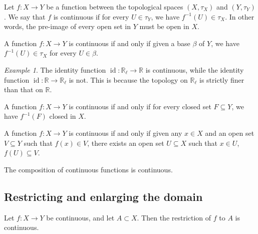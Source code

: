 \documentclass[11pt]{article}
\newcommand{\R}{\mathbb{R}}
\theoremstyle{definition}
\theoremstyle{remark}
\newtheorem*{example}{Example}
\numberwithin{equation}{section}
\begin{document}
    \begin{definition}
        Let $f\colon X \to Y$ be a function between the topological spaces $(X,
        \tau_X)$ and $(Y, \tau_Y)$. We say that $f$ is continuous if for every $U
        \in \tau_Y$, we have $f^{-1}(U) \in \tau_X$. In other words, the pre-image of
        every open set in $Y$ must be open in $X$.
    \end{definition}

    \begin{lemma}
        A function $f\colon X \to Y$ is continuous if and only if given a base
        $\beta$ of $Y$, we have $f^{-1}(U) \in \tau_X$ for every $U \in \beta$.
    \end{lemma}
    \begin{example}
        The identity function $\operatorname{id}\colon \R_\ell \to \R$ is continuous, while the
        identity function $\operatorname{id}\colon \R \to \R_\ell$ is not. This is
        because the topology on $\R_\ell$ is strictly finer than that on $\R$.
    \end{example}

    \begin{lemma}
        A function $f\colon X \to Y$ is continuous if and only if for every closed
        set $F \subseteq Y$, we have $f^{-1}(F)$ closed in $X$.
    \end{lemma}

    \begin{lemma}
        A function $f\colon X \to Y$ is continuous if and only if given any $x \in X$
        and an open set $V \subseteq Y$ such that $f(x) \in V$, there exists an open
        set $U \subseteq X$ such that $x \in U$, $f(U) \subseteq V$.
    \end{lemma}

    \begin{theorem}
        The composition of continuous functions is continuous.
    \end{theorem}

    
    \subsection{Restricting and enlarging the domain}

    \begin{lemma}
        Let $f\colon X \to Y$ be continuous, and let $A \subset X$. Then the
        restriction of $f$ to $A$ is continuous.
    \end{lemma}
\end{document}
